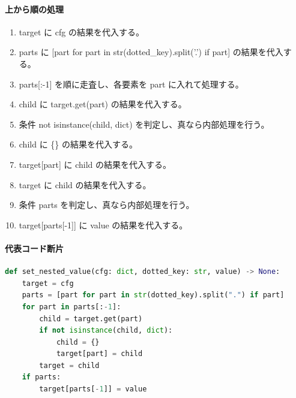 \documentclass[a4paper,11pt]{article}
\begin{document}
            \paragraph{上から順の処理}
            \begin{enumerate}[leftmargin=1.8em]
            \item target に cfg の結果を代入する。
\item parts に [part for part in str(dotted\_key).split('.') if part] の結果を代入する。
\item parts[:-1] を順に走査し、各要素を part に入れて処理する。
\item   child に target.get(part) の結果を代入する。
\item   条件 not isinstance(child, dict) を判定し、真なら内部処理を行う。
\item     child に \{\} の結果を代入する。
\item     target[part] に child の結果を代入する。
\item   target に child の結果を代入する。
\item 条件 parts を判定し、真なら内部処理を行う。
\item   target[parts[-1]] に value の結果を代入する。
            \end{enumerate}
            \paragraph{代表コード断片}
            \begin{lstlisting}[language=Python]
def set_nested_value(cfg: dict, dotted_key: str, value) -> None:
    target = cfg
    parts = [part for part in str(dotted_key).split(".") if part]
    for part in parts[:-1]:
        child = target.get(part)
        if not isinstance(child, dict):
            child = {}
            target[part] = child
        target = child
    if parts:
        target[parts[-1]] = value
\end{lstlisting}
\end{document}
